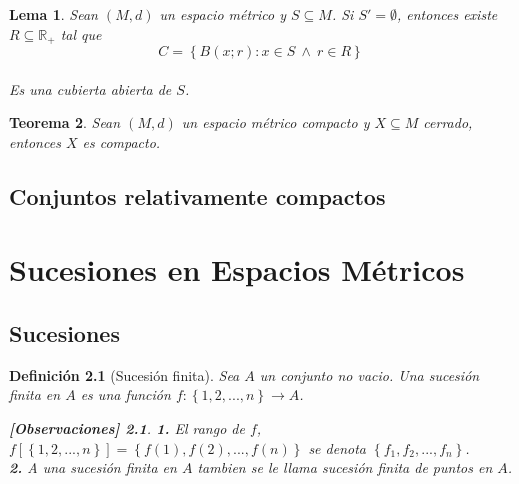 \documentclass[oneside]{book} %
\theoremstyle{Teorema}
\newtheorem{Definicion}{Definición}[chapter]
\newtheorem{Teorema}[Definicion]{Teorema}
\newtheorem{Lema}[Definicion]{Lema}
\theoremstyle{Ejemplos}
\theoremstyle{[Obs]}
\newtheorem*{Obs}{[Observaciones]}
\renewcommand{\{}{\left\lbrace} %
\renewcommand{\}}{\right\rbrace} %
\newcommand{\y}{\ \wedge\ } %
\renewcommand{\sc}{\subseteq} %
\newcommand{\R}{\mathbb{R}} %
\begin{document}
			\begin{Lema}

				Sean $(M, d)$ un espacio métrico y $S \sc M$. Si $S' = \emptyset$, entonces existe $R \sc \R_{+}$ tal que \\

				\[ C = \{ B(x;r) : x \in S \y r \in R \} \] \\

				Es una cubierta abierta de $S$. \\

			\end{Lema}

			\begin{Teorema}
				
				Sean $(M, d)$ un espacio métrico compacto y $X \sc M$ cerrado, entonces $X$ es compacto. \\

			\end{Teorema}

		\section{Conjuntos relativamente compactos}

	\chapter{Sucesiones en Espacios Métricos}

		\section{Sucesiones}

			\begin{Definicion}[Sucesión finita]
				
				Sea $A$ un conjunto no vacio. Una sucesión finita en $A$ es una función $f : \{ 1, 2, ..., n \} \to A$. \\
				
				\begin{Obs}
				
					\hfill
				
					\textbf{1.} El rango de $f$, $f[\{ 1, 2, ..., n \}] = \{ f(1), f(2), ..., f(n) \}$ se denota $\{ f_1, f_2, ..., f_n \}$. \\

					\textbf{2.} A una sucesión finita en $A$ tambien se le llama sucesión finita de puntos en $A$. \\
				
				\end{Obs}

			\end{Definicion}
\end{document}

